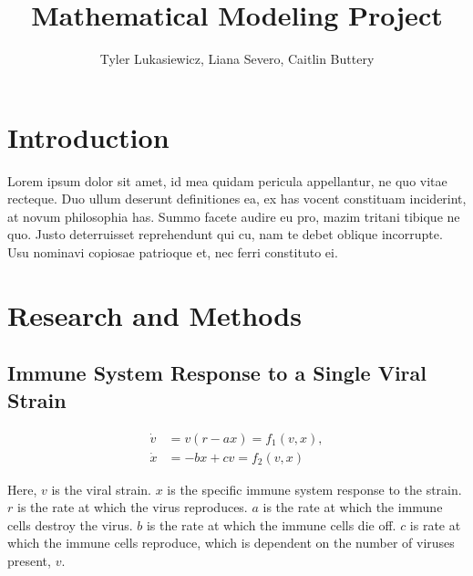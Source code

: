 \documentclass{article}
\title{Mathematical Modeling Project}
\author{Tyler Lukasiewicz, Liana Severo, Caitlin Buttery}
\begin{document}
\maketitle
{}
\section{Introduction}
\label{sec:Introduction}
Lorem ipsum dolor sit amet, id mea quidam pericula appellantur, ne quo vitae recteque. Duo ullum deserunt definitiones ea, ex has vocent constituam inciderint, at novum philosophia has. Summo facete audire eu pro, mazim tritani tibique ne quo. Justo deterruisset reprehendunt qui cu, nam te debet oblique incorrupte. Usu nominavi copiosae patrioque et, nec ferri constituto ei.


\section{Research and Methods}
\label{sec:Main part}

\subsection{Immune System Response to a Single Viral Strain}
\begin{equation}
    \begin{split}
        \dot v &= v(r-ax) = f_1(v,x), \\
        \dot x &= -bx + cv = f_2(v,x)
    \end{split}
\end{equation}

Here, $v$ is the viral strain. $x$ is the specific immune system response to the strain. $r$ is the rate at which the virus reproduces. $a$ is the rate at which the immune cells destroy the virus. $b$ is the rate at which the immune cells die off. $c$ is rate at which the immune cells reproduce, which is dependent on the number of viruses present, $v$.  
\end{document}
